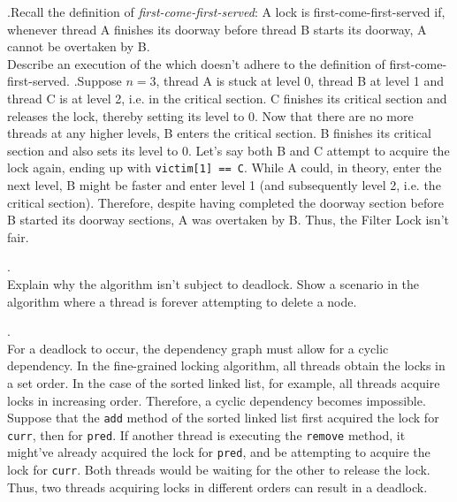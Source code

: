 \documentclass[main]{subfiles}
\begin{document}
\begin{ExerciseList}
        
        \Exercise[title={Fairness},label=Filter].\quad Recall the definition of \textit{first-come-first-served}: A lock is first-come-first-served if, whenever thread A finishes its doorway before thread B starts its doorway, A cannot be overtaken by B. \\[3mm]
        Describe an execution of the  which doesn't adhere to the definition of first-come-first-served.
        \Answer[ref={Filter}].\quad Suppose $n = 3$, thread A is stuck at level 0, thread B at level 1 and thread C is at level 2, i.e. in the critical section. C finishes its critical section and releases the lock, thereby setting its level to 0. Now that there are no more threads at any higher levels, B enters the critical section. B finishes its critical section and also sets its level to 0. Let's say both B and C attempt to acquire the lock again, ending up with \texttt{victim[1] == C}. While A could, in theory, enter the next level, B might be faster and enter level 1 (and subsequently level 2, i.e. the critical section). Therefore, despite having completed the doorway section before B started its doorway sections, A was overtaken by B. Thus, the Filter Lock isn't fair.
        
        
        \Exercise[title={Lock Granularity},label=LG].\quad \\
            \Question Explain why the  algorithm isn't subject to deadlock.
            \Question Show a scenario in the  algorithm where a thread is forever attempting to delete a node.
        \pagebreak
            
        \Answer[ref={LG}].\quad \\
            \Question For a deadlock to occur, the dependency graph must allow for a cyclic dependency. In the fine-grained locking algorithm, all threads obtain the locks in a set order. In the case of the sorted linked list, for example, all threads acquire locks in increasing order. Therefore, a cyclic dependency becomes impossible.\\[3mm]
            Suppose that the \texttt{add} method of the sorted linked list first acquired the lock for \texttt{curr}, then for \texttt{pred}. If another thread is executing the \texttt{remove} method, it might've already acquired the lock for \texttt{pred}, and be attempting to acquire the lock for \texttt{curr}. Both threads would be waiting for the other to release the lock. Thus, two threads acquiring locks in different orders can result in a deadlock.
            

\end{ExerciseList}
\end{document}
